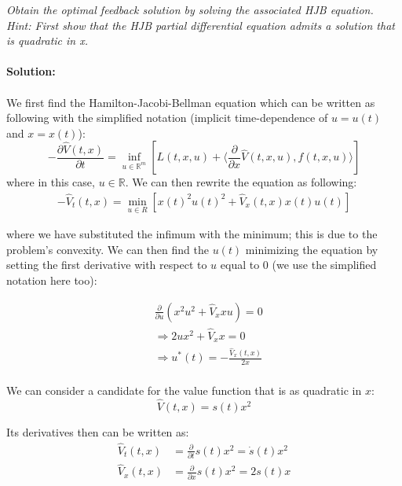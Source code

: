 \emph{Obtain the optimal feedback solution by solving the associated HJB equation.}\\
\emph{Hint: First show that the HJB partial differential equation admits a solution that is quadratic in x.}
\\
\\
\textbf{Solution:}\\
\\
We first find the Hamilton-Jacobi-Bellman equation which can be written as following with the simplified notation (implicit time-dependence of $u = u(t)$ and $x = x(t)$):
\begin{equation}
    -\frac{\partial \hat{V}(t,x)}{\partial t} = \inf_{u \in \mathbb{R}^m} \left[ L(t, x, u) + \bigg \langle \frac{\partial}{\partial x} \hat{V}(t, x, u), f(t,x,u) \bigg \rangle \right]
\end{equation}
where in this case, $u \in \mathbb{R}$. %
We can then rewrite the equation as following:
\begin{align}
    -\hat{V}_t(t,x) = \min_{u \in R} \left[ x(t)^2u(t)^2 + \hat{V}_x(t, x) x(t)u(t) \right]
\end{align}

where we have substituted the infimum with the minimum; this is due to the problem's convexity. We can then find the $u(t)$ minimizing the equation by setting the first derivative with respect to $u$ equal to 0 (we use the simplified notation here too):

\begin{align}
    &\frac{\partial}{\partial u} \left( x^2 u^2 + \hat{V}_x xu  \right) = 0\\
    &\Longrightarrow 2ux^2 + \hat{V}_x x = 0\\
    &\Longrightarrow u^*(t) = - \frac{\hat{V}_x(t,x)}{2x}\\
\end{align}

We can consider a candidate for the value function that is as quadratic in $x$:
\begin{equation}
    \hat{V}(t, x) = s(t)x^2
\end{equation}

Its derivatives then can be written as:
\begin{align}
    \hat{V}_t(t,x) &= \frac{\partial}{\partial t} s(t)x^2 = \Dot{s}(t) x^2\\
    \hat{V}_x(t,x) &= \frac{\partial}{\partial x} s(t)x^2 = 2s(t)x\\
\end{align}


